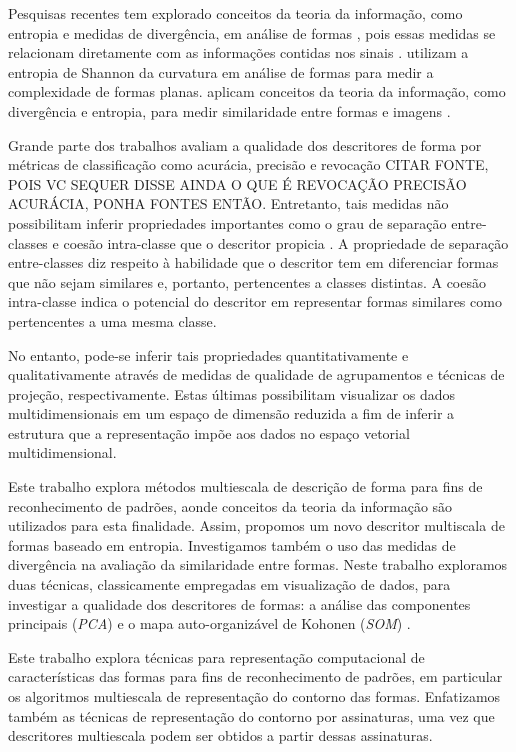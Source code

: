 Pesquisas recentes \cite{Principe:2014,Zang:2014} tem explorado conceitos da teoria da informação, como entropia e medidas de divergência, em análise de formas \cite{Escolano:2009}, pois essas medidas se relacionam diretamente com as informações contidas nos sinais \cite{Principe:2011}.  utilizam a entropia de Shannon da curvatura em análise de formas para medir a complexidade de formas planas.  aplicam conceitos da teoria da informação, como divergência e entropia, para medir similaridade entre formas e imagens \cite{Principe:2014,Zang:2014}.

Grande parte dos trabalhos avaliam a qualidade dos descritores de forma por métricas de classificação como acurácia, precisão e revocação  {\color{red} CITAR FONTE, POIS VC SEQUER DISSE AINDA O QUE É REVOCAÇÃO PRECISÃO ACURÁCIA, PONHA FONTES ENTÃO}. Entretanto, tais medidas não possibilitam inferir propriedades importantes como o grau de separação entre-classes e coesão intra-classe que o descritor propicia \cite{Meta:2009}. A propriedade de separação entre-classes diz respeito à habilidade que o descritor tem em diferenciar formas que não sejam similares e, portanto, pertencentes a classes distintas. A coesão intra-classe indica o potencial do descritor em representar formas similares como pertencentes a uma mesma classe.  

No entanto, pode-se inferir tais propriedades quantitativamente e qualitativamente através de medidas de qualidade de agrupamentos \cite{Meta:2009} e técnicas de projeção, respectivamente. Estas últimas possibilitam visualizar os dados multidimensionais em um espaço de dimensão reduzida a fim de inferir a estrutura que a representação impõe aos dados no espaço vetorial multidimensional.

Este trabalho explora métodos multiescala de descrição de forma para fins de reconhecimento de padrões, aonde conceitos da teoria da informação são utilizados para esta finalidade. Assim, propomos um novo descritor multiscala de formas baseado em entropia.  Investigamos também o uso das medidas de divergência na avaliação da similaridade entre formas. 
Neste trabalho exploramos duas técnicas, classicamente empregadas em visualização de dados, para investigar a qualidade dos descritores de formas: a análise das componentes principais (\emph{PCA}) e o mapa auto-organizável de Kohonen (\textit{SOM}) \cite{Kohonen:1982}.   

Este trabalho explora técnicas para representação computacional de características das formas para fins de reconhecimento de padrões, em particular os algoritmos multiescala de representação do contorno das formas.  Enfatizamos também as técnicas de representação do contorno por assinaturas, uma vez que descritores multiescala podem ser obtidos a partir dessas assinaturas. 

